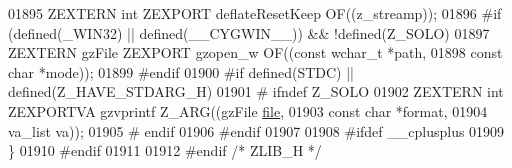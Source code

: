 \begin{DoxyCode}
01895 ZEXTERN \textcolor{keywordtype}{int}            ZEXPORT deflateResetKeep OF((z\_streamp));
01896 \textcolor{preprocessor}{#if (defined(\_WIN32) || defined(\_\_CYGWIN\_\_)) && !defined(Z\_SOLO)}
01897 ZEXTERN gzFile         ZEXPORT gzopen\_w OF((\textcolor{keyword}{const} \textcolor{keywordtype}{wchar\_t} *path,
01898                                             \textcolor{keyword}{const} \textcolor{keywordtype}{char} *mode));
01899 \textcolor{preprocessor}{#endif}
01900 \textcolor{preprocessor}{#if defined(STDC) || defined(Z\_HAVE\_STDARG\_H)}
01901 \textcolor{preprocessor}{#  ifndef Z\_SOLO}
01902 ZEXTERN \textcolor{keywordtype}{int}            ZEXPORTVA gzvprintf Z\_ARG((gzFile \hyperlink{structfile}{file},
01903                                                   \textcolor{keyword}{const} \textcolor{keywordtype}{char} *format,
01904                                                   va\_list va));
01905 \textcolor{preprocessor}{#  endif}
01906 \textcolor{preprocessor}{#endif}
01907 
01908 \textcolor{preprocessor}{#ifdef \_\_cplusplus}
01909 \}
01910 \textcolor{preprocessor}{#endif}
01911 
01912 \textcolor{preprocessor}{#endif }\textcolor{comment}{/* ZLIB\_H */}\textcolor{preprocessor}{}
\end{DoxyCode}

